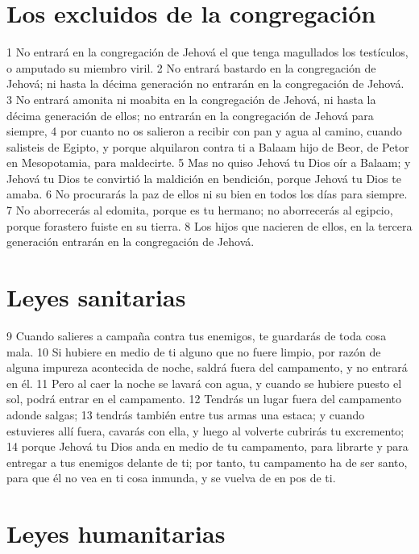\section{Los excluidos de la congregación}

1 No entrará en la congregación de Jehová el que tenga magullados los testículos, o amputado su miembro viril.
2 No entrará bastardo en la congregación de Jehová; ni hasta la décima generación no entrarán en la congregación de Jehová.
3 No entrará amonita ni moabita en la congregación de Jehová, ni hasta la décima generación de ellos; no entrarán en la congregación de Jehová para siempre,
4 por cuanto no os salieron a recibir con pan y agua al camino, cuando salisteis de Egipto, y porque alquilaron contra ti a Balaam hijo de Beor, de Petor en Mesopotamia, para maldecirte.
5 Mas no quiso Jehová tu Dios oír a Balaam; y Jehová tu Dios te convirtió la maldición en bendición, porque Jehová tu Dios te amaba.
6 No procurarás la paz de ellos ni su bien en todos los días para siempre.
7 No aborrecerás al edomita, porque es tu hermano; no aborrecerás al egipcio, porque forastero fuiste en su tierra.
8 Los hijos que nacieren de ellos, en la tercera generación entrarán en la congregación de Jehová.

\section{Leyes sanitarias}

9 Cuando salieres a campaña contra tus enemigos, te guardarás de toda cosa mala.
10 Si hubiere en medio de ti alguno que no fuere limpio, por razón de alguna impureza acontecida de noche, saldrá fuera del campamento, y no entrará en él.
11 Pero al caer la noche se lavará con agua, y cuando se hubiere puesto el sol, podrá entrar en el campamento.
12 Tendrás un lugar fuera del campamento adonde salgas;
13 tendrás también entre tus armas una estaca; y cuando estuvieres allí fuera, cavarás con ella, y luego al volverte cubrirás tu excremento;
14 porque Jehová tu Dios anda en medio de tu campamento, para librarte y para entregar a tus enemigos delante de ti; por tanto, tu campamento ha de ser santo, para que él no vea en ti cosa inmunda, y se vuelva de en pos de ti.

\section{Leyes humanitarias}

